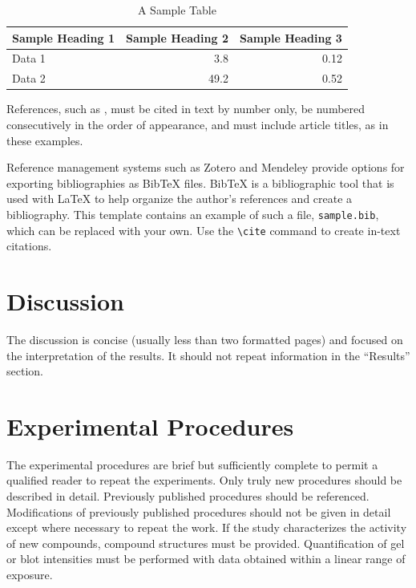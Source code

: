 \documentclass[alpha-refs]{wiley-article}
\begin{document}
\begin{article}
\begin{table}[hp!]\centering
\begin{tabular}{l r r}
Sample Heading 1 & Sample Heading 2 & Sample Heading 3\\
\hline
Data 1 & 3.8 & 0.12 \\
Data 2 & 49.2 & 0.52
\end{tabular}
\caption{A Sample Table}
\label{tab:sample}
\end{table}

References, such as \cite{macdonald1995difference,sambrook1989molecular,waskiewicz1997mitogen,back:etal:2017}, must be cited in text by number only, be numbered consecutively in the order of appearance, and must include article titles, as in these examples. 

Reference management systems such as Zotero and Mendeley provide options for exporting bibliographies as Bib\TeX{} files. Bib\TeX{} is a bibliographic tool that is used with \LaTeX{} to help organize the author's references and create a bibliography. This template contains an example of such a file, \texttt{sample.bib}, which can be replaced with your own. Use the \verb|\cite| command  to create in-text citations.

\section{Discussion}

The discussion is concise (usually less than two formatted pages) and focused on the interpretation of the results. It should not repeat information in the ``Results'' section.

\section{Experimental Procedures}

The experimental procedures are brief but sufficiently complete to permit a qualified reader to repeat the experiments. Only truly new procedures should be described in detail. Previously published procedures should be referenced. Modifications of previously published procedures should not be given in detail except where necessary to repeat the work. If the study characterizes the activity of new compounds, compound structures must be provided. Quantification of gel or blot intensities must be performed with data obtained within a linear range of exposure.

\end{article}
\end{document}
